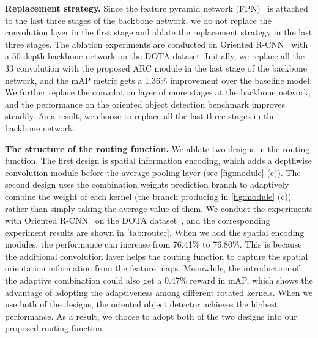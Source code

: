 {\bf Replacement strategy.} Since the feature pyramid network (FPN)~\cite{lin2017feature} is attached to the last three stages of the backbone network, we do not replace the convolution layer in the first stage and ablate the replacement strategy in the last three stages. The ablation experiments are conducted on Oriented R-CNN~\cite{xie2021oriented} with a 50-depth backbone network on the DOTA dataset. Initially, we replace all the 33 convolution with the proposed ARC module in the last stage of the backbone network, and the mAP metric gets a 1.36\% improvement over the baseline model. We further replace the convolution layer of more stages at the backbone network, and the performance on the oriented object detection benchmark improves steadily. As a result, we choose to replace all the last three stages in the backbone network.





{\bf The structure of the routing function.} We ablate two designs in the routing function. The first design is spatial information encoding, which adds a depthwise convolution module before the average pooling layer (see \cref{fig:module}{\color{red} (c)}). The second design uses the combination weights prediction branch to adaptively combine the weight of each kernel (the branch producing  in \cref{fig:module}{\color{red} (c)}) rather than simply taking the average value of them. We conduct the experiments with Oriented R-CNN~\cite{xie2021oriented} on the DOTA dataset~\cite{xia2018dota}, and the corresponding experiment results are shown in \cref{tab:router}. When we add the spatial encoding modules, the performance can increase from 76.41\% to 76.80\%. This is because the additional convolution layer helps the routing function to capture the spatial orientation information from the feature maps. Meanwhile, the introduction of the adaptive combination could also get a 0.47\% reward in mAP, which shows the advantage of adopting the adaptiveness among different rotated kernels. When we use both of the designs, the oriented object detector achieves the highest performance. As a result, we choose to adopt both of the two designs into our proposed routing function.




